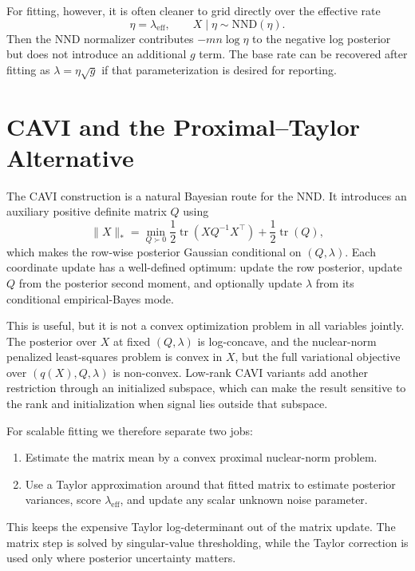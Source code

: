 \documentclass[11pt]{article}
\begin{document}
For fitting, however, it is often cleaner to grid directly over the effective
rate
\begin{equation}
    \eta = \lambda_{\mathrm{eff}},
    \qquad
    X\mid\eta\sim\mathrm{NND}(\eta).
\end{equation}
Then the NND normalizer contributes $-mn\log\eta$ to the negative log posterior
but does not introduce an additional $g$ term.  The base rate can be recovered
after fitting as $\lambda=\eta\sqrt{g}$ if that parameterization is desired for
reporting.

\section{CAVI and the Proximal--Taylor Alternative}

The CAVI construction is a natural Bayesian route for the NND.  It introduces an auxiliary positive definite matrix $Q$ using
\begin{equation}
    \|X\|_*
    =
    \min_{Q\succ 0}
    \frac{1}{2}\operatorname{tr}(XQ^{-1}X^\top)
    +
    \frac{1}{2}\operatorname{tr}(Q),
\end{equation}
which makes the row-wise posterior Gaussian conditional on $(Q,\lambda)$.  Each coordinate update has a well-defined optimum: update the row posterior, update $Q$ from the posterior second moment, and optionally update $\lambda$ from its conditional empirical-Bayes mode.

This is useful, but it is not a convex optimization problem in all variables jointly.  The posterior over $X$ at fixed $(Q,\lambda)$ is log-concave, and the nuclear-norm penalized least-squares problem is convex in $X$, but the full variational objective over $(q(X),Q,\lambda)$ is non-convex.  Low-rank CAVI variants add another restriction through an initialized subspace, which can make the result sensitive to the rank and initialization when signal lies outside that subspace.

For scalable fitting we therefore separate two jobs:
\begin{enumerate}
    \item Estimate the matrix mean by a convex proximal nuclear-norm problem.
    \item Use a Taylor approximation around that fitted matrix to estimate posterior variances, score $\lambda_{\mathrm{eff}}$, and update any scalar unknown noise parameter.
\end{enumerate}
This keeps the expensive Taylor log-determinant out of the matrix update.  The matrix step is solved by singular-value thresholding, while the Taylor correction is used only where posterior uncertainty matters.
\end{document}
